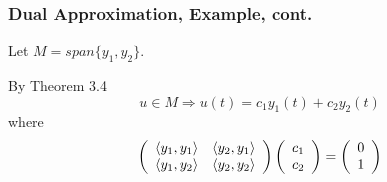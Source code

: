 \documentclass{beamer}
\begin{document}
\begin{frame}\frametitle{Dual Approximation, Example, cont.}	
		
	Let $M = span\{y_1,y_2\}$.

	By Theorem 3.4 
	\[ 
	u \in M \Rightarrow u(t) = c_1y_1(t) + c_2y_2(t) 
	\]
	where
	\[ \left(
	\begin{array}{cc}
	\left<y_1,y_1 \right> & \left<y_2,y_1 \right>\\
	\left<y_1,y_2 \right> & \left<y_2,y_2 \right>
	\end{array}
	\right)\left(
	\begin{array}{c}
	c_1\\
	c_2
	\end{array}
	\right) = \left(
	\begin{array}{c}
	0\\1
	\end{array}
	\right) \]

\end{frame}
\end{document}
